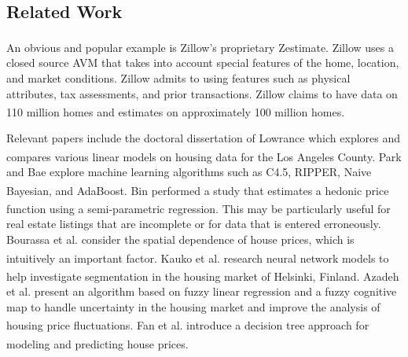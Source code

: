 \documentclass[10pt]{article}
\begin{document}
\begin{multicols}{2}
		\section{Related Work}
		An obvious and popular example is Zillow's proprietary Zestimate\textsuperscript{\textregistered}. Zillow uses a closed source AVM that takes into account special features of the home, location, and market conditions. Zillow admits to using features such as physical attributes, tax assessments, and prior transactions. Zillow claims to have data on 110 million homes and estimates on approximately 100 million homes.\textsuperscript{\cite{zillow}}
		\par
		Relevant papers include the doctoral dissertation of Lowrance which explores and compares various linear models on housing data for the Los Angeles County.\textsuperscript{\cite{lowrance}} Park and Bae explore machine learning algorithms such as C4.5, RIPPER, Naive Bayesian, and AdaBoost.\textsuperscript{\cite{park}} Bin performed a study that estimates a hedonic price function using a semi-parametric regression.\textsuperscript{\cite{bin}} This may be particularly useful for real estate listings that are incomplete or for data that is entered erroneously. Bourassa et al. consider the spatial dependence of house prices, which is intuitively an important factor.\textsuperscript{\cite{bourassa1}\cite{bourassa2}} Kauko et al. research neural network models to help investigate segmentation in the housing market of Helsinki, Finland.\textsuperscript{\cite{kauko}} Azadeh et al. present an algorithm based on fuzzy linear regression and a fuzzy cognitive map to handle uncertainty in the housing market and improve the analysis of housing price fluctuations.\textsuperscript{\cite{azadeh}} Fan et al. introduce a decision tree approach for modeling and predicting house prices.\textsuperscript{\cite{fan}}

\end{multicols}
\end{document}
